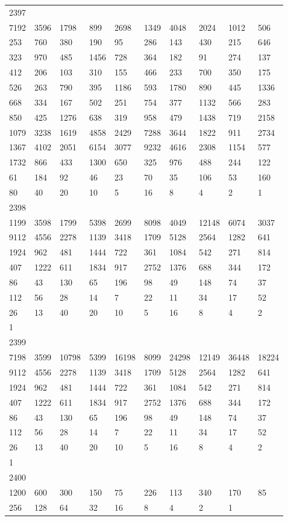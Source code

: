 \begin{longtable}{*{10}{l}}
2397&&&&&&&&&\\
7192& 3596& 1798& 899& 2698& 1349& 4048& 2024& 1012& 506\\
253& 760& 380& 190& 95& 286& 143& 430& 215& 646\\
323& 970& 485& 1456& 728& 364& 182& 91& 274& 137\\
412& 206& 103& 310& 155& 466& 233& 700& 350& 175\\
526& 263& 790& 395& 1186& 593& 1780& 890& 445& 1336\\
668& 334& 167& 502& 251& 754& 377& 1132& 566& 283\\
850& 425& 1276& 638& 319& 958& 479& 1438& 719& 2158\\
1079& 3238& 1619& 4858& 2429& 7288& 3644& 1822& 911& 2734\\
1367& 4102& 2051& 6154& 3077& 9232& 4616& 2308& 1154& 577\\
1732& 866& 433& 1300& 650& 325& 976& 488& 244& 122\\
61& 184& 92& 46& 23& 70& 35& 106& 53& 160\\
80& 40& 20& 10& 5& 16& 8& 4& 2& 1\\

2398&&&&&&&&&\\
1199& 3598& 1799& 5398& 2699& 8098& 4049& 12148& 6074& 3037\\
9112& 4556& 2278& 1139& 3418& 1709& 5128& 2564& 1282& 641\\
1924& 962& 481& 1444& 722& 361& 1084& 542& 271& 814\\
407& 1222& 611& 1834& 917& 2752& 1376& 688& 344& 172\\
86& 43& 130& 65& 196& 98& 49& 148& 74& 37\\
112& 56& 28& 14& 7& 22& 11& 34& 17& 52\\
26& 13& 40& 20& 10& 5& 16& 8& 4& 2\\
1& \\

2399&&&&&&&&&\\
7198& 3599& 10798& 5399& 16198& 8099& 24298& 12149& 36448& 18224\\
9112& 4556& 2278& 1139& 3418& 1709& 5128& 2564& 1282& 641\\
1924& 962& 481& 1444& 722& 361& 1084& 542& 271& 814\\
407& 1222& 611& 1834& 917& 2752& 1376& 688& 344& 172\\
86& 43& 130& 65& 196& 98& 49& 148& 74& 37\\
112& 56& 28& 14& 7& 22& 11& 34& 17& 52\\
26& 13& 40& 20& 10& 5& 16& 8& 4& 2\\
1& \\

2400&&&&&&&&&\\
1200& 600& 300& 150& 75& 226& 113& 340& 170& 85\\
256& 128& 64& 32& 16& 8& 4& 2& 1& \\
\bottomrule\end{longtable}
